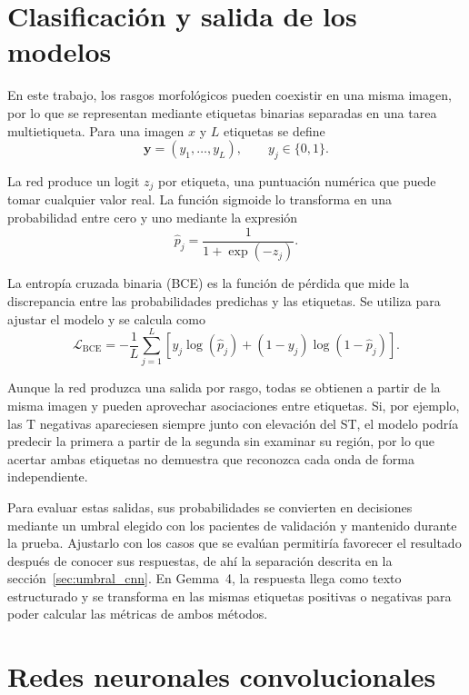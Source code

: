 \section{Clasificación y salida de los modelos}
\label{sec:clasificacion}

En este trabajo, los rasgos morfológicos pueden coexistir en una misma imagen, por lo que se representan mediante etiquetas binarias separadas en una tarea multietiqueta. Para una imagen \(x\) y \(L\) etiquetas se define
\begin{equation}
\mathbf{y}=(y_1,\ldots,y_L), \qquad y_j\in\{0,1\}.
\end{equation}

La red produce un logit \(z_j\) por etiqueta, una puntuación numérica que puede tomar cualquier valor real. La función sigmoide lo transforma en una probabilidad entre cero y uno mediante la expresión
\begin{equation}
\hat{p}_j=\frac{1}{1+\exp(-z_j)}.
\end{equation}

La entropía cruzada binaria (BCE) es la función de pérdida que mide la discrepancia entre las probabilidades predichas y las etiquetas. Se utiliza para ajustar el modelo y se calcula como
\begin{equation}
\mathcal{L}_{\mathrm{BCE}}=
-\frac{1}{L}\sum_{j=1}^{L}
\left[y_j\log(\hat{p}_j)+(1-y_j)\log(1-\hat{p}_j)\right].
\label{eq:bce}
\end{equation}

Aunque la red produzca una salida por rasgo, todas se obtienen a partir de la misma imagen y pueden aprovechar asociaciones entre etiquetas. Si, por ejemplo, las T negativas apareciesen siempre junto con elevación del ST, el modelo podría predecir la primera a partir de la segunda sin examinar su región, por lo que acertar ambas etiquetas no demuestra que reconozca cada onda de forma independiente.

Para evaluar estas salidas, sus probabilidades se convierten en decisiones mediante un umbral elegido con los pacientes de validación y mantenido durante la prueba. Ajustarlo con los casos que se evalúan permitiría favorecer el resultado después de conocer sus respuestas, de ahí la separación descrita en la sección~\ref{sec:umbral_cnn}. En Gemma~4, la respuesta llega como texto estructurado y se transforma en las mismas etiquetas positivas o negativas para poder calcular las métricas de ambos métodos.

\section{Redes neuronales convolucionales}
\label{sec:fundamentos_cnn}

